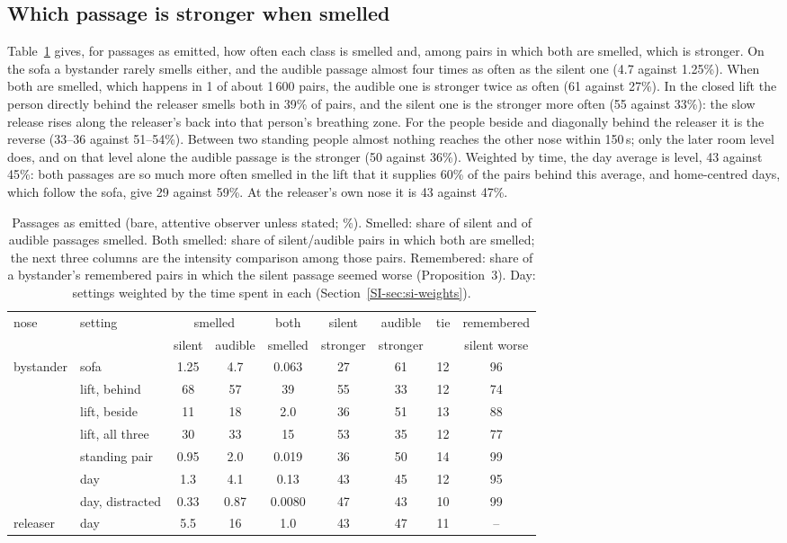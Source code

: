 \subsection{Which passage is stronger when smelled}
\label{sec:res-headline}
Table~\ref{tab:headline} gives, for passages as emitted, how often each class is smelled and, among pairs in which
both are smelled, which is stronger. On the sofa a bystander rarely smells either, and the audible passage almost
four times as often as the silent one (4.7 against 1.25\%). When both are smelled, which happens in 1 of about
1\,600 pairs, the audible one is stronger twice as often (61 against 27\%). In the closed lift the person directly behind
the releaser smells both in 39\% of pairs, and the silent one is the stronger more often (55 against 33\%): the
slow release rises along the releaser's back into that person's breathing zone. For the people beside and diagonally
behind the releaser it is the reverse (33--36 against 51--54\%). Between two standing people almost nothing reaches
the other nose within 150\,s; only the later room level does, and on that level alone the audible passage is the
stronger (50 against 36\%). Weighted by time, the day average is level, 43 against 45\%: both passages are so much more
often smelled in the lift that it supplies 60\% of the pairs behind this average, and home-centred days, which follow
the sofa, give 29 against 59\%. At the releaser's own nose it is 43 against 47\%.

\begin{table}
\caption{Passages as emitted (bare, attentive observer unless stated; \%). Smelled: share of silent and of audible
passages smelled. Both smelled: share of silent/audible pairs in which both are smelled; the next three columns are
the intensity comparison among those pairs. Remembered: share of a bystander's remembered pairs in which the silent
passage seemed worse (Proposition~3). Day: settings weighted by the time spent in each
(Section~\ref{SI-sec:si-weights}).}
\label{tab:headline}
\small
\setlength{\tabcolsep}{4pt}
\begin{tabular}{llccccccc}
\toprule
nose & setting & \multicolumn{2}{c}{smelled} & both & silent & audible & tie & remembered \\
 & & silent & audible & smelled & stronger & stronger & & silent worse \\
\midrule
bystander & sofa & 1.25 & 4.7 & 0.063 & 27 & 61 & 12 & 96 \\
 & lift, behind & 68 & 57 & 39 & 55 & 33 & 12 & 74 \\
 & lift, beside & 11 & 18 & 2.0 & 36 & 51 & 13 & 88 \\
 & lift, all three & 30 & 33 & 15 & 53 & 35 & 12 & 77 \\
 & standing pair & 0.95 & 2.0 & 0.019 & 36 & 50 & 14 & 99 \\
 & day & 1.3 & 4.1 & 0.13 & 43 & 45 & 12 & 95 \\
 & day, distracted & 0.33 & 0.87 & 0.0080 & 47 & 43 & 10 & 99 \\
releaser & day & 5.5 & 16 & 1.0 & 43 & 47 & 11 & -- \\
\bottomrule
\end{tabular}
\end{table}

